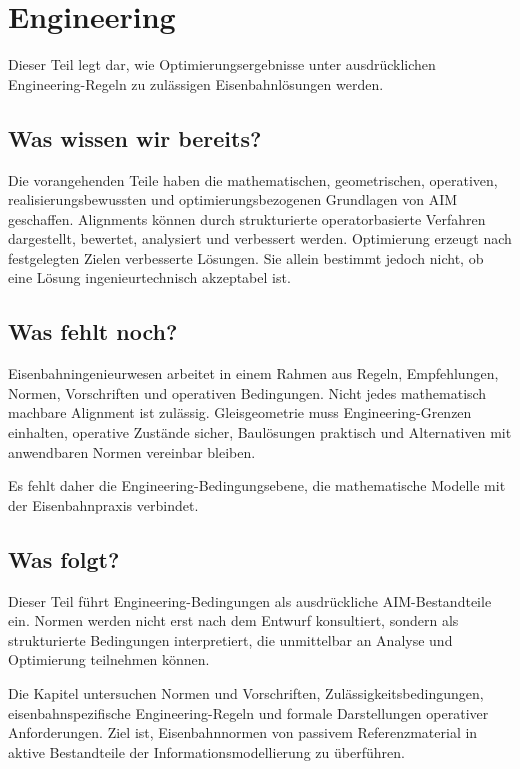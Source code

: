 \chapter*{Engineering}
{}

Dieser Teil legt dar, wie Optimierungsergebnisse unter ausdrücklichen
Engineering-Regeln zu zulässigen Eisenbahnlösungen werden.

\section*{Was wissen wir bereits?}
Die vorangehenden Teile haben die mathematischen, geometrischen, operativen,
realisierungsbewussten und optimierungsbezogenen Grundlagen von AIM geschaffen.
Alignments können durch strukturierte operatorbasierte Verfahren dargestellt,
bewertet, analysiert und verbessert werden. Optimierung erzeugt nach
festgelegten Zielen verbesserte Lösungen. Sie allein bestimmt jedoch nicht, ob
eine Lösung ingenieurtechnisch akzeptabel ist.

\section*{Was fehlt noch?}
Eisenbahningenieurwesen arbeitet in einem Rahmen aus Regeln, Empfehlungen,
Normen, Vorschriften und operativen Bedingungen. Nicht jedes mathematisch
machbare Alignment ist zulässig. Gleisgeometrie muss Engineering-Grenzen
einhalten, operative Zustände sicher, Baulösungen praktisch und Alternativen
mit anwendbaren Normen vereinbar bleiben.

Es fehlt daher die Engineering-Bedingungsebene, die mathematische Modelle mit
der Eisenbahnpraxis verbindet.

\section*{Was folgt?}
Dieser Teil führt Engineering-Bedingungen als ausdrückliche AIM-Bestandteile
ein. Normen werden nicht erst nach dem Entwurf konsultiert, sondern als
strukturierte Bedingungen interpretiert, die unmittelbar an Analyse und
Optimierung teilnehmen können.

Die Kapitel untersuchen Normen und Vorschriften, Zulässigkeitsbedingungen,
eisenbahnspezifische Engineering-Regeln und formale Darstellungen operativer
Anforderungen. Ziel ist, Eisenbahnnormen von passivem Referenzmaterial in
aktive Bestandteile der Informationsmodellierung zu überführen.


